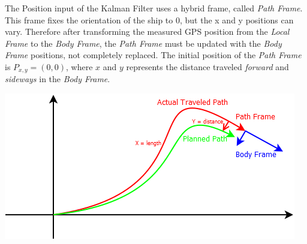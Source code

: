 The Position input of the Kalman Filter uses a hybrid frame, called \emph{Path Frame}. This frame fixes the orientation of the ship to 0, but the x and y positions can vary. Therefore after transforming the measured GPS position from the \emph{Local Frame} to the \emph{Body Frame}, the \emph{Path Frame} must be updated with the \emph{Body Frame} positions, not completely replaced. The initial position of the \emph{Path Frame} is $P_{x,y} = (0, 0)$, where $x$ and $y$ represents the distance traveled \emph{forward} and \emph{sideways} in the \emph{Body Frame}.

\includegraphics[width = \textwidth]{img/ControlStrategyFigures/PathFrame.png}

